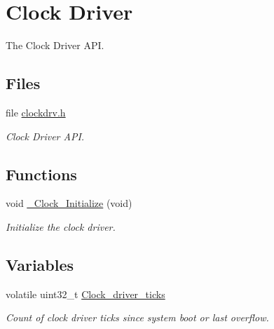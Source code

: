 \hypertarget{group__RTEMSDriverClock}{}\section{Clock Driver}
\label{group__RTEMSDriverClock}


The Clock Driver A\+PI.  


\subsection*{Files}
\begin{DoxyCompactItemize}
\item 
file \mbox{\hyperlink{clockdrv_8h}{clockdrv.\+h}}
\begin{DoxyCompactList}\small\item\em Clock Driver A\+PI. \end{DoxyCompactList}\end{DoxyCompactItemize}
\subsection*{Functions}
\begin{DoxyCompactItemize}
\item 
\mbox{\label{group__RTEMSDriverClock_gafddd4d0e38336d3fbc84b05d0dcd5cbe}} 
void \mbox{\hyperlink{group__RTEMSDriverClock_gafddd4d0e38336d3fbc84b05d0dcd5cbe}{\+\_\+\+Clock\+\_\+\+Initialize}} (void)
\begin{DoxyCompactList}\small\item\em Initialize the clock driver. \end{DoxyCompactList}\end{DoxyCompactItemize}
\subsection*{Variables}
\begin{DoxyCompactItemize}
\item 
volatile uint32\+\_\+t \mbox{\hyperlink{group__RTEMSDriverClock_ga154adab6b69d3a14e921cfe8b2649d20}{Clock\+\_\+driver\+\_\+ticks}}
\begin{DoxyCompactList}\small\item\em Count of clock driver ticks since system boot or last overflow. \end{DoxyCompactList}\end{DoxyCompactItemize}


